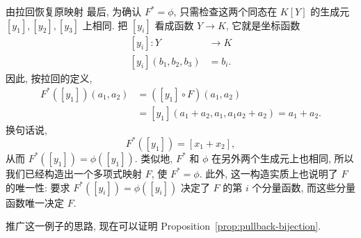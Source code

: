 \begin{Example}{由拉回恢复原映射}
  最后, 为确认 $F^{*}=\phi$, 只需检查这两个同态在 $K[Y]$ 的生成元 $[y_{1}],[y_{2}],[y_{3}]$ 上相同. 把 $[y_{i}]$ 看成函数 $Y\to K$, 它就是坐标函数
  \[
    \begin{aligned}
      [y_{i}]:Y&\to K\\
      [y_{i}](b_{1},b_{2},b_{3})&=b_{i}.
    \end{aligned}
  \]
  因此, 按拉回的定义,
  \[
    \begin{aligned}
      F^{*}([y_{1}])(a_{1},a_{2})
        &=([y_{1}]\circ F)(a_{1},a_{2})\\
        &=[y_{1}](a_{1}+a_{2},a_{1},a_{1}a_{2}+a_{2})=a_{1}+a_{2}.
    \end{aligned}
  \]
  换句话说,
  \[
    F^{*}([y_{1}])=[x_{1}+x_{2}],
  \]
  从而 $F^{*}([y_{1}])=\phi([y_{1}])$. 类似地, $F^{*}$ 和 $\phi$ 在另外两个生成元上也相同, 所以我们已经构造出一个多项式映射 $F$, 使 $F^{*}=\phi$. 此外, 这一构造实质上也说明了 $F$ 的唯一性: 要求 $F^{*}([y_{i}])=\phi([y_{i}])$ 决定了 $F$ 的第 $i$ 个分量函数, 而这些分量函数唯一决定 $F$.
\end{Example}

推广这一例子的思路, 现在可以证明 Proposition~\ref{prop:pullback-bijection}.

